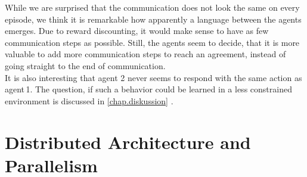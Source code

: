 While we are surprised that the communication does not look the same on every episode, we think it is remarkable how apparently a language between the agents emerges. Due to reward discounting, it would make sense to have as few communication steps as possible. Still, the agents seem to decide, that it is more valuable to add more communication steps to reach an agreement, instead of going straight to the end of communication.\\
It is also interesting that agent 2 never seems to respond with the same action as agent\,1. The question, if such a behavior could be learned in a less constrained environment is discussed in \ref{chap.diskussion} .
\newpage
\section{Distributed Architecture and Parallelism}\label{dist_architecture}
